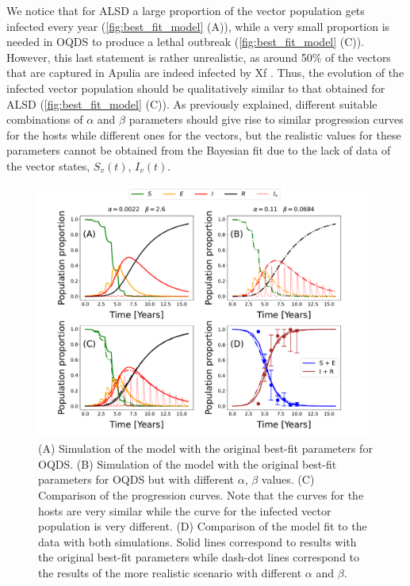 We notice that for ALSD a large proportion of the vector population gets
infected every year (\cref{fig:best_fit_model} (A)), while a very small
proportion is needed in OQDS to produce a lethal outbreak
(\cref{fig:best_fit_model} (C)). However, this last statement is rather
unrealistic, as around 50\% of the vectors that are captured in Apulia are
indeed infected by Xf \cite{Cavalieri2019,cornara2017transmission}. Thus, the
evolution of the infected vector population should be qualitatively similar to
that obtained for ALSD (\cref{fig:best_fit_model} (C)). As previously
explained,
different suitable combinations of $\alpha$ and $\beta$ parameters should give
rise to similar progression curves for the hosts while different ones for the
vectors, but the realistic values for these parameters cannot be obtained from
the Bayesian fit due to the lack of data of the vector states, $S_v(t)$,
$I_v(t)$.

\begin{figure}[H]
    \centering

    \includegraphics[width=\textwidth]{Figures/OQDS_different_vector_curves_same_host_curve.pdf}
    \caption{(A) Simulation of the model with the original best-fit
        parameters for OQDS. (B) Simulation of the model with the original
        best-fit
        parameters for OQDS but with different $\alpha$, $\beta$ values. (C)
        Comparison
        of the progression curves. Note that the curves for the hosts are very
        similar
        while the curve for the infected vector population is very different.
        (D)
        Comparison of the model fit to the data with both simulations. Solid
        lines
        correspond to results with the original best-fit parameters while
        dash-dot
        lines correspond to the results of the more realistic scenario with
        different
        $\alpha$ and $\beta$.}
    \label{fig:best_fit_model_OQDS}
\end{figure}

